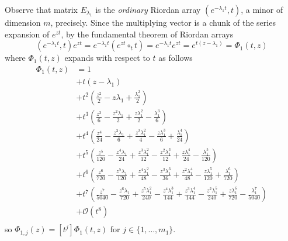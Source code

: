 
Observe that matrix $E_{\lambda_{1}}$ is the \textit{ordinary} Riordan array
$\left(e^{-\lambda_{1}t}, t\right)$, a minor of dimension $m$, precisely.
Since the multiplying vector is a chunk of the series expansion of $e^{zt}$, by
the fundamental theorem of Riordan arrays
\begin{displaymath}
\left(e^{-\lambda_{1}t}, t\right)e^{zt} = e^{-\lambda_{1}t} \left(e^{zt}\circ_{t} t \right) =  e^{-\lambda_{1}t} e^{zt} = e^{t(z - \lambda_{1})} = \Phi_{1}(t, z)
\end{displaymath}
where $\Phi_{1}(t, z)$ expands with respect to $t$ as follows
\begin{displaymath}
\begin{split}
\Phi_{1}(t, z) &= 1 \\
               &+ t \left(z - \lambda_{1}\right) \\
               &+ t^{2} \left(\frac{z^{2}}{2} - z \lambda_{1} + \frac{\lambda_{1}^{2}}{2}\right) \\
               &+ t^{3} \left(\frac{z^{3}}{6} - \frac{z^{2} \lambda_{1}}{2} + \frac{z \lambda_{1}^{2}}{2} - \frac{\lambda_{1}^{3}}{6}\right) \\
               &+ t^{4} \left(\frac{z^{4}}{24} - \frac{z^{3} \lambda_{1}}{6} + \frac{z^{2} \lambda_{1}^{2}}{4} - \frac{z \lambda_{1}^{3}}{6} + \frac{\lambda_{1}^{4}}{24}\right) \\
               &+ t^{5} \left(\frac{z^{5}}{120} - \frac{z^{4} \lambda_{1}}{24} + \frac{z^{3} \lambda_{1}^{2}}{12} - \frac{z^{2} \lambda_{1}^{3}}{12} + \frac{z \lambda_{1}^{4}}{24} - \frac{\lambda_{1}^{5}}{120}\right)\\
               &+ t^{6} \left(\frac{z^{6}}{720} - \frac{z^{5} \lambda_{1}}{120} + \frac{z^{4} \lambda_{1}^{2}}{48} - \frac{z^{3} \lambda_{1}^{3}}{36} + \frac{z^{2} \lambda_{1}^{4}}{48} - \frac{z \lambda_{1}^{5}}{120} + \frac{\lambda_{1}^{6}}{720}\right)\\
               &+ t^{7} \left(\frac{z^{7}}{5040} - \frac{z^{6} \lambda_{1}}{720} + \frac{z^{5} \lambda_{1}^{2}}{240} - \frac{z^{4} \lambda_{1}^{3}}{144} + \frac{z^{3} \lambda_{1}^{4}}{144} - \frac{z^{2} \lambda_{1}^{5}}{240} + \frac{z \lambda_{1}^{6}}{720} - \frac{\lambda_{1}^{7}}{5040}\right) \\
               &+ \mathcal{O}\left(t^{8}\right)\\
\end{split}
\end{displaymath}
so $\Phi_{1, j}(z) = [t^{j}]\Phi_{1}(t, z)$ for $j \in  \lbrace 1,\ldots, m_{1} \rbrace$.

